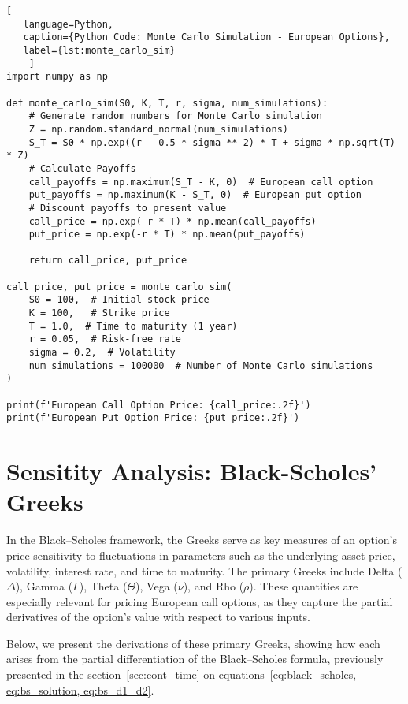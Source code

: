         \begin{lstlisting}[
   language=Python,
   caption={Python Code: Monte Carlo Simulation - European Options},
   label={lst:monte_carlo_sim}
    ]
import numpy as np

def monte_carlo_sim(S0, K, T, r, sigma, num_simulations):
    # Generate random numbers for Monte Carlo simulation
    Z = np.random.standard_normal(num_simulations)
    S_T = S0 * np.exp((r - 0.5 * sigma ** 2) * T + sigma * np.sqrt(T) * Z)
    # Calculate Payoffs
    call_payoffs = np.maximum(S_T - K, 0)  # European call option
    put_payoffs = np.maximum(K - S_T, 0)  # European put option
    # Discount payoffs to present value
    call_price = np.exp(-r * T) * np.mean(call_payoffs)
    put_price = np.exp(-r * T) * np.mean(put_payoffs)

    return call_price, put_price

call_price, put_price = monte_carlo_sim(
    S0 = 100,  # Initial stock price
    K = 100,   # Strike price
    T = 1.0,  # Time to maturity (1 year)
    r = 0.05,  # Risk-free rate
    sigma = 0.2,  # Volatility
    num_simulations = 100000  # Number of Monte Carlo simulations
)

print(f'European Call Option Price: {call_price:.2f}')
print(f'European Put Option Price: {put_price:.2f}')

   \end{lstlisting}

\section{Sensitity Analysis: Black-Scholes' Greeks}
    \label{sec:sens_analysis}

    In the Black–Scholes framework, the Greeks serve as key measures of an option’s price sensitivity to fluctuations
    in parameters such as the underlying asset price, volatility, interest rate, and time to maturity.
    The primary Greeks include Delta ($\Delta$), Gamma ($\Gamma$), Theta ($\Theta$), Vega ($\nu$), and Rho ($\rho$).
    These quantities are especially relevant for pricing European call options,
    as they capture the partial derivatives of the option’s value with respect to various inputs.

    Below, we present the derivations of these primary Greeks,
    showing how each arises from the partial differentiation of the Black–Scholes formula,
    previously presented in the section~\ref{sec:cont_time}
    on equations~\ref{eq:black_scholes, eq:bs_solution, eq:bs_d1_d2}.

